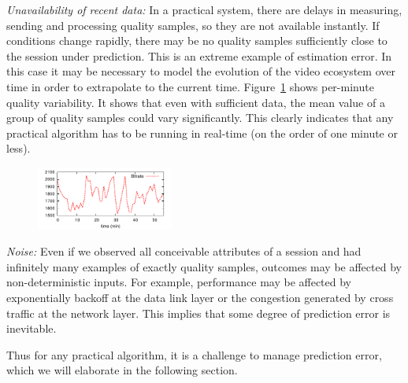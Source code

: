 \begin{packedenumerate}
\item \emph{Unavailability of recent data:} In a practical system, there are delays in measuring, sending and processing quality samples, so they are not available instantly.  If conditions change rapidly, there may be no quality samples sufficiently close to the session under prediction.  This is an extreme example of estimation error.  In this case it may be necessary to model the evolution of the video ecosystem over time in order to extrapolate to the current time. Figure~\ref{fig:quality-variability} shows per-minute quality variability. It shows that even with sufficient data, the mean value of a group of quality samples could vary significantly. This clearly indicates that any practical algorithm has to be running in real-time (on the order of one minute or less).

\begin{figure}[h!]
\centering
 \includegraphics[width=0.4\textwidth] {figures/quality-time.pdf}
\label{fig:quality-variability}
\end{figure}

  \item \emph{Noise:} Even if we observed all conceivable attributes of a session and had infinitely many examples of exactly quality samples, outcomes may be affected by non-deterministic inputs.  For example, performance may be affected by exponentially backoff at the data link layer or the congestion generated by cross traffic at the network layer. This implies that some degree of prediction error is inevitable.
\end{packedenumerate}


Thus for any practical algorithm, it is a challenge to manage prediction error, which we will elaborate in the following section.

